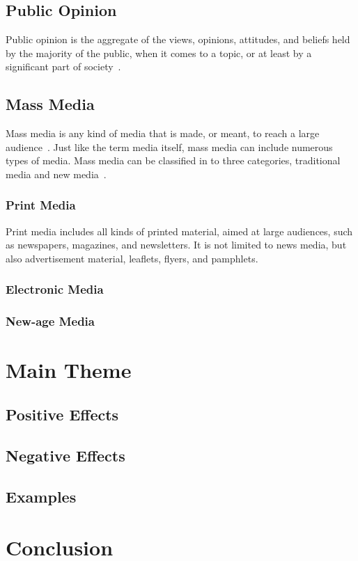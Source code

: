 \documentclass[a4paper,12pt]{article}
\begin{document}
\subsection{Public Opinion}
Public opinion is the aggregate of the views, opinions, attitudes, and beliefs held by the majority of the public,
when it comes to a topic, or at least by a significant part of society~\parencite{davison2024public}.
\subsection{Mass Media}
Mass media is any kind of media that is made, or meant, to reach a large audience~\parencite{duignan2024mass}.
Just like the term media itself, mass media can include numerous types of media.
Mass media can be classified in to three categories, traditional media and new media~\parencite{manohar2008different}.
\subsubsection{Print Media}
Print media includes all kinds of printed material, aimed at large audiences, such as newspapers, magazines, and newsletters.
It is not limited to news media, but also advertisement material, leaflets, flyers, and pamphlets.
\subsubsection{Electronic Media}
\subsubsection{New-age Media}

\section{Main Theme}
\subsection{Positive Effects}
\subsection{Negative Effects}
\subsection{Examples}

\section{Conclusion}

\newpage
\printbibliography
\end{document}
